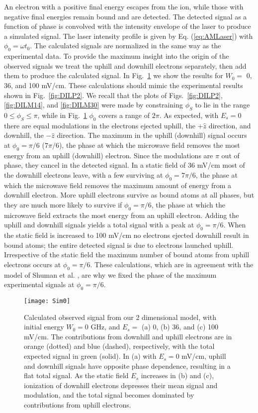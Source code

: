\documentclass[aps,pra,reprint,groupedaddress]{revtex4-1}
\begin{document}
An electron with a positive final energy escapes from the ion, while those with negative final energies remain bound and are detected. The detected signal as a function of phase is convolved with the intensity envelope of the laser to produce a simulated signal. The laser intensity profile is given by Eq. (\ref{eq:AMLaser}) with $\phi_0=\omega t_0$. The calculated signals are normalized in the same way as the experimental data. To provide the maximum insight into the origin of the observed signals we treat the uphill and downhill electrons separately, then add them to produce the calculated signal.
In Fig.~\ref{fig:2DW0} we show the results for $W_0 =$ 0, 36, and 100 mV/cm. These calculations should mimic the experimental results shown in Fig.~\ref{fig:DILP2}. We recall that the plots of Figs.~\ref{fig:DILP2}, \ref{fig:DILM14}, and \ref{fig:DILM30} were made by constraining $\phi_S$ to lie in the range $0 \leq \phi_S \leq \pi$, while in Fig.~\ref{fig:2DW0} $\phi_0$ covers a range of $2\pi$. As expected, with $E_s=0$ there are equal modulations in the electrons ejected uphill, the $+\hat{z}$ direction, and downhill, the $-\hat{z}$ direction. The maximum in the uphill (downhill) signal occurs at $\phi_0=\pi/6$ ($7\pi/6$), the phase at which the microwave field removes the most energy from an uphill (downhill) electron. Since the modulations are $\pi$ out of phase, they cancel in the detected signal. In a static field of 36 mV/cm most of the downhill electrons leave, with a few surviving at $\phi_0=7\pi/6$, the phase at which the microwave field removes the maximum amount of energy from a downhill electron. More uphill electrons survive as bound atoms at all phases, but they are much more likely to survive if $\phi_0=\pi/6$, the phase at which the microwave field extracts the most energy from an uphill electron. Adding the uphill and downhill signals yields a total signal with a peak at $\phi_0=\pi/6$. When the static field is increased to 100 mV/cm no electrons ejected downhill result in bound atoms; the entire detected signal is due to electrons launched uphill. Irrespective of the static field the maximum number of bound atoms from uphill electrons occurs at $\phi_0=\pi/6$. These calculations, which are in agreement with the model of Shuman et al. \cite{Shuman}, are why we fixed the phase of the maximum experimental signals at $\phi_0=\pi/6$.

\begin{figure}
	\texttt{[image: Sim0]}
	\caption{Calculated observed signal from our 2 dimensional model, with initial energy $W_0 = 0$ GHz, and $E_s =$ (a) 0, (b) 36, and (c) 100 mV/cm. The contributions from downhill and uphill electrons are in orange (dotted) and blue (dashed), respectively, with the total expected signal in green (solid). In (a) with $E_s = 0$ mV/cm, uphill and downhill signals have opposite phase dependence, resulting in a flat total signal. As the static field $E_s$ increases in (b) and (c), ionization of downhill electrons depresses their mean signal and modulation, and the total signal becomes dominated by contributions from uphill electrons.}
	\label{fig:2DW0}
\end{figure}
\end{document}
